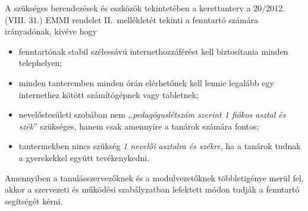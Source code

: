 A szükséges berendezések és eszközök tekintetében a kerettanterv a	20/2012. (VIII. 31.) EMMI rendelet II.~mellékletét tekinti a fenntartó számára irányadónak, kivéve hogy
\begin{itemize}
    \item fenntartónak stabil szélessávú internethozzáférést kell biztosítania minden telephelyen;
    \item minden tanteremben minden órán elérhetőnek kell lennie legalább egy internethez kötött számítógépnek vagy tabletnek;
    \item nevelőstesületi szobában nem ,,\emph{pedagóguslétszám szerint 1 fiókos asztal és szék}'' szükséges, hanem csak amennyire a tanárok számára fontos;
    \item tantermekben nincs szükség \emph{1 nevelői asztalra és székre}, ha a tanárok tudnak a gyerekekkel együtt tevékenykedni.
\end{itemize}

Amennyiben a tanulásszervezőknek és a modulvezetőknek többletigénye merül fel, akkor a szervezeti és működési szabályzatban lefektett módon tudják a fenntartó segítségét kérni.